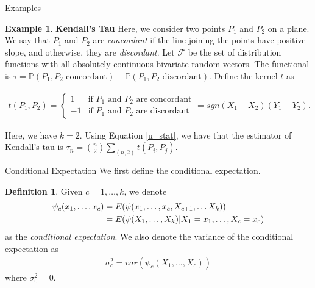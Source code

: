 \documentclass{beamer}
\theoremstyle{definition}
\newtheorem{Def}{Definition}
\numberwithin{Def}{section}
\newtheorem{ex}{Example}
\begin{document}
\begin{frame}{Examples}
\begin{ex}\textbf{Kendall's Tau} Here, we consider two points $P_1$ and $P_2$ on a plane. We say that $P_1$ and $P_2$ are \textit{concordant} if the line joining the points have positive slope, and otherwise, they are \textit{discordant}. Let $\mathcal{F}$ be the set of distribution functions with all absolutely continuous bivariate random vectors. The functional is $\tau = \mathbb{P}(P_1, P_2 \text{ concordant}) - \mathbb{P}(P_1, P_2 \text{ discordant})$. Define the kernel $t$ as 
\begin{fontsize}{10}{12}
\begin{align*}
    t(P_1, P_2) = \begin{cases} 1 & \text{if $P_1$ and $P_2$ are concordant} \\ -1 & \text{if $P_1$ and $P_2$ are discordant} 
    \end{cases} = sgn(X_1 - X_2)(Y_1 - Y_2).
\end{align*}
\end{fontsize}
\noindent Here, we have $k=2$. Using Equation \ref{u_stat}, we have that the estimator of Kendall's tau is $\tau_n = {n \choose 2}\sum_{(n,2)}t(P_i, P_j)$.
\end{ex}    
\end{frame}

\begin{frame}{Conditional Expectation}
We first define the conditional expectation.
\begin{Def}
Given $c = 1, \dotsc, k$, we denote \begin{align}
    \psi_c(x_1, \dotsc, x_c) &= E(\psi(x_1, \dotsc, x_c, X_{c+1}, \dotsc X_k)) \notag \\
    &= E(\psi(X_1, \dotsc, X_k)|X_1 = x_1, \dotsc, X_c = x_c)
\end{align}
as the \textit{conditional expectation}. We also denote the variance of the conditional expectation as 
\begin{align}
    \sigma_c^2 = var(\psi_c(X_1, \dotsc, X_c))
\end{align}
where $\sigma_0^2 = 0$. 
\end{Def}
\end{frame}
\end{document}
